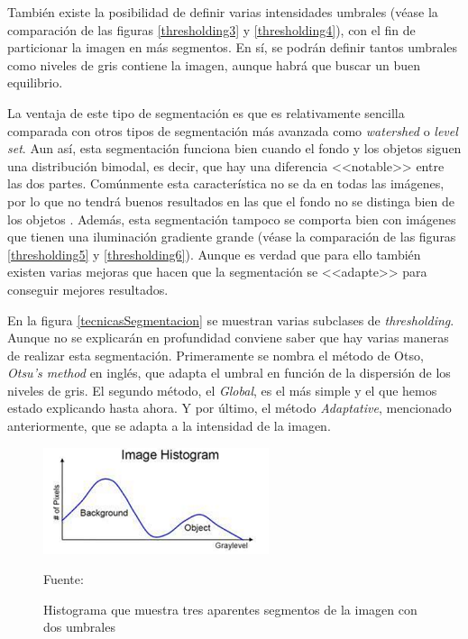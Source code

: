 Tambi\'{e}n existe la posibilidad de definir varias intensidades umbrales (v\'{e}ase la comparaci\'{o}n de las figuras \ref{thresholding3} y \ref{thresholding4}), con el fin de particionar la imagen en m\'{a}s segmentos. En s\'{i}, se podr\'{a}n definir tantos umbrales como niveles de gris contiene la imagen, aunque habr\'{a} que buscar un buen equilibrio. 

La ventaja de este tipo de segmentaci\'{o}n es que es relativamente sencilla comparada con otros tipos de segmentaci\'{o}n m\'{a}s avanzada como \textit{watershed} o \textit{level set}. Aun as\'{i}, esta segmentaci\'{o}n funciona bien cuando el fondo y los objetos siguen una distribuci\'{o}n bimodal, es decir, que hay una diferencia <<notable>> entre las dos partes. Com\'{u}nmente esta caracter\'{i}stica no se da en todas las im\'{a}genes, por lo que no tendr\'{a} buenos resultados en las que el fondo no se distinga bien de los objetos \cite{basa1}. Adem\'{a}s, esta segmentaci\'{o}n tampoco se comporta bien con im\'{a}genes que tienen una iluminaci\'{o}n gradiente grande (v\'{e}ase la comparaci\'{o}n de las figuras \ref{thresholding5} y \ref{thresholding6}). Aunque es verdad que para ello tambi\'{e}n existen varias mejoras que hacen que la segmentaci\'{o}n se <<adapte>> para conseguir mejores resultados.

En la figura \ref{tecnicasSegmentacion} se muestran varias subclases de \textit{thresholding}. Aunque no se explicar\'{a}n en profundidad conviene saber que hay varias maneras de realizar esta segmentaci\'{o}n. Primeramente se nombra el m\'{e}todo de Otso, \textit{Otsu's method} en ingl\'{e}s, que adapta el umbral en funci\'{o}n de la dispersi\'{o}n de los niveles de gris. El segundo m\'{e}todo, el \textit{Global}, es el m\'{a}s simple y el que hemos estado explicando hasta ahora. Y por \'{u}ltimo, el m\'{e}todo \textit{Adaptative}, mencionado anteriormente, que se adapta a la intensidad de la imagen.

\begin{figure}[H]
	\centering
	\captionsetup{justification=centering}
	\includegraphics[width=.65\textwidth]{./imagenes/imageHistogram}
	\caption{Histograma que muestra tres aparentes segmentos de la imagen con dos umbrales}
	\vspace{2 mm}					
	Fuente: \cite{basa1}	
	\label{imageHistogram}
\end{figure}


